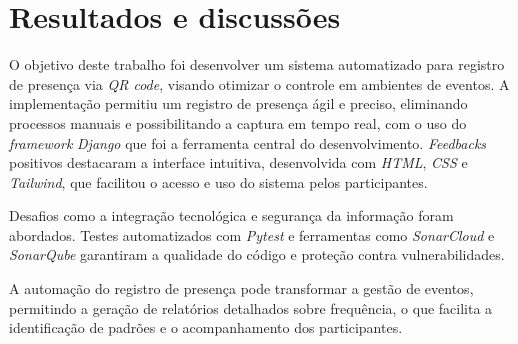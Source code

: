 \section{Resultados e discussões}
\label{sec:resultados_discussoes}

O objetivo deste trabalho foi desenvolver um sistema automatizado para registro de presença via \textit{QR code}, visando otimizar o controle em ambientes de eventos. A implementação permitiu um registro de presença ágil e preciso, eliminando processos manuais e possibilitando a captura em tempo real, com o uso do \textit{framework} \textit{Django} que foi a ferramenta central do desenvolvimento. \textit{Feedbacks} positivos destacaram a interface intuitiva, desenvolvida com \textit{HTML}, \textit{CSS} e \textit{Tailwind}, que facilitou o acesso e uso do sistema pelos participantes.

Desafios como a integração tecnológica e segurança da informação foram abordados. Testes automatizados com \textit{Pytest} e ferramentas como \textit{SonarCloud} e \textit{SonarQube} garantiram a qualidade do código e proteção contra vulnerabilidades.

A automação do registro de presença pode transformar a gestão de eventos, permitindo a geração de relatórios detalhados sobre frequência, o que facilita a identificação de padrões e o acompanhamento dos participantes.
